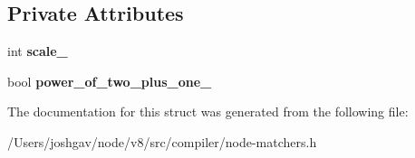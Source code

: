 \subsection*{Private Attributes}
\begin{DoxyCompactItemize}
\item 
int {\bfseries scale\+\_\+}\hypertarget{structv8_1_1internal_1_1compiler_1_1_scale_matcher_ab09ccf13ba9227b33146d114e72e6af9}{}\label{structv8_1_1internal_1_1compiler_1_1_scale_matcher_ab09ccf13ba9227b33146d114e72e6af9}

\item 
bool {\bfseries power\+\_\+of\+\_\+two\+\_\+plus\+\_\+one\+\_\+}\hypertarget{structv8_1_1internal_1_1compiler_1_1_scale_matcher_a38a8f2cd3cc734ef316cc69c1911424c}{}\label{structv8_1_1internal_1_1compiler_1_1_scale_matcher_a38a8f2cd3cc734ef316cc69c1911424c}

\end{DoxyCompactItemize}


The documentation for this struct was generated from the following file\+:\begin{DoxyCompactItemize}
\item 
/\+Users/joshgav/node/v8/src/compiler/node-\/matchers.\+h\end{DoxyCompactItemize}
